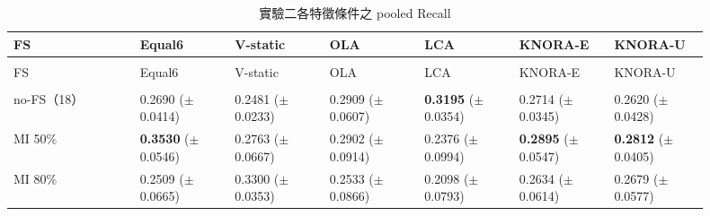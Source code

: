 \begingroup
\small{}\setlength{\tabcolsep}{3pt}
\setlength{\LTleft}{\fill}\setlength{\LTright}{\fill}
\begin{longtable}{@{}>{\raggedright\arraybackslash}p{0.16\linewidth}>{\raggedright\arraybackslash}p{0.123\linewidth}>{\raggedright\arraybackslash}p{0.123\linewidth}>{\raggedright\arraybackslash}p{0.123\linewidth}>{\raggedright\arraybackslash}p{0.123\linewidth}>{\raggedright\arraybackslash}p{0.123\linewidth}>{\raggedright\arraybackslash}p{0.123\linewidth}@{}}
\caption{實驗二各特徵條件之 pooled Recall}\label{tab:results-fs-recall}\\
\toprule
FS & Equal6 & V-static & OLA & LCA & KNORA-E & KNORA-U \\
\midrule\endfirsthead
\multicolumn{7}{c}{表~\thetable（續）}\\
\toprule
FS & Equal6 & V-static & OLA & LCA & KNORA-E & KNORA-U \\
\midrule\endhead
\midrule\multicolumn{7}{r}{續下頁}\\\endfoot
\bottomrule\endlastfoot
no-FS（18） & \shortstack[l]{0.2690\\{\scriptsize(\(\pm\)0.0414)}} & \shortstack[l]{0.2481\\{\scriptsize(\(\pm\)0.0233)}} & \shortstack[l]{0.2909\\{\scriptsize(\(\pm\)0.0607)}} & \shortstack[l]{\textbf{0.3195}\\{\scriptsize(\(\pm\)0.0354)}} & \shortstack[l]{0.2714\\{\scriptsize(\(\pm\)0.0345)}} & \shortstack[l]{0.2620\\{\scriptsize(\(\pm\)0.0428)}} \\
MI 50\% & \shortstack[l]{\textbf{0.3530}\\{\scriptsize(\(\pm\)0.0546)}} & \shortstack[l]{0.2763\\{\scriptsize(\(\pm\)0.0667)}} & \shortstack[l]{0.2902\\{\scriptsize(\(\pm\)0.0914)}} & \shortstack[l]{0.2376\\{\scriptsize(\(\pm\)0.0994)}} & \shortstack[l]{\textbf{0.2895}\\{\scriptsize(\(\pm\)0.0547)}} & \shortstack[l]{\textbf{0.2812}\\{\scriptsize(\(\pm\)0.0405)}} \\
MI 80\% & \shortstack[l]{0.2509\\{\scriptsize(\(\pm\)0.0665)}} & \shortstack[l]{0.3300\\{\scriptsize(\(\pm\)0.0353)}} & \shortstack[l]{0.2533\\{\scriptsize(\(\pm\)0.0866)}} & \shortstack[l]{0.2098\\{\scriptsize(\(\pm\)0.0793)}} & \shortstack[l]{0.2634\\{\scriptsize(\(\pm\)0.0614)}} & \shortstack[l]{0.2679\\{\scriptsize(\(\pm\)0.0577)}} \\

\end{longtable}
